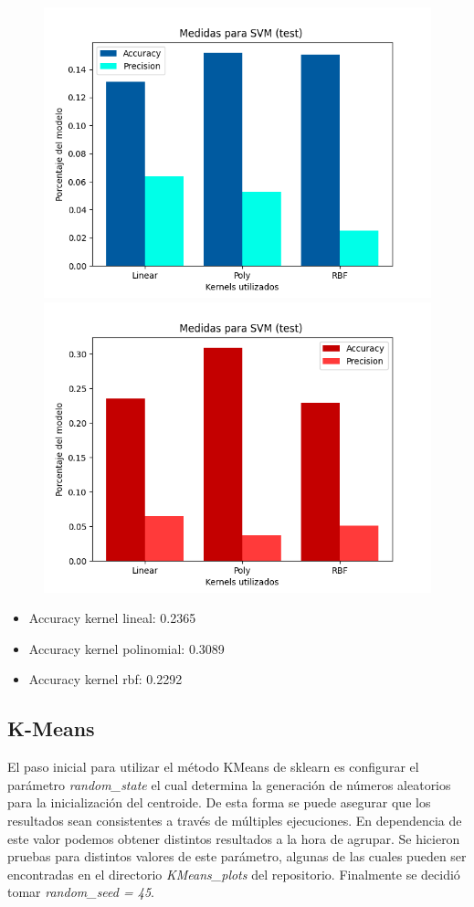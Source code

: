 \documentclass[10pt, a4paper]{article}
\begin{document}
            \begin{figure}[H]
                \centering
                \includegraphics[width = 0.45\linewidth]{Medias_group.png}
                \includegraphics[width = 0.45\linewidth]{final_gruop.png}

            \end{figure}

            \begin{itemize}
                \item [] Accuracy kernel lineal: 0.2365
                \item [] Accuracy kernel polinomial: 0.3089
                \item [] Accuracy kernel rbf: 0.2292
            \end{itemize}
	
		\subsection{K-Means}
		
		El paso inicial para utilizar el m\'etodo KMeans de sklearn es configurar el parámetro \textit{random\_state} el cual determina la generación de números aleatorios para la inicialización del centroide. De esta forma se puede asegurar que los resultados sean consistentes a trav\'es de múltiples ejecuciones. En dependencia de este valor podemos obtener distintos resultados a la hora de agrupar. Se hicieron pruebas para distintos valores de este par\'ametro, algunas de las cuales pueden ser encontradas en el directorio \textit{KMeans\_plots} del repositorio. Finalmente se decidi\'o tomar \textit{random\_seed = 45}. \\
		
\end{document}
